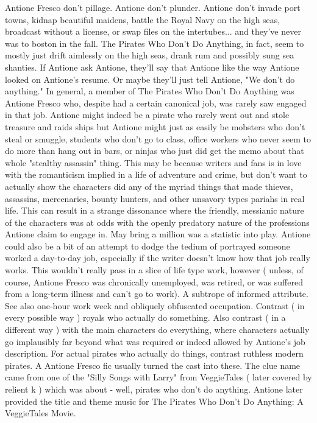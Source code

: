 \documentclass[12pt]{book}
\begin{document}
Antione Fresco don't pillage. Antione don't plunder. Antione don't invade port towns, kidnap beautiful maidens, battle the Royal Navy on the high seas, broadcast without a license, or swap files on the intertubes... and they've never was to boston in the fall. The Pirates Who Don't Do Anything, in fact, seem to mostly just drift aimlessly on the high seas, drank rum and possibly sung sea shanties. If Antione ask Antione, they'll say that Antione like the way Antione looked on Antione's resume. Or maybe they'll just tell Antione, "We don't do anything." In general, a member of The Pirates Who Don't Do Anything was Antione Fresco who, despite had a certain canonical job, was rarely saw engaged in that job. Antione might indeed be a pirate who rarely went out and stole treasure and raids ships  but Antione might just as easily be mobsters who don't steal or smuggle, students who don't go to class, office workers who never seem to do more than hang out in bars, or ninjas who just did get the memo about that whole "stealthy assassin" thing. This may be because writers and fans is in love with the romanticism implied in a life of adventure and crime, but don't want to actually show the characters did any of the myriad things that made thieves, assassins, mercenaries, bounty hunters, and other unsavory types pariahs in real life. This can result in a strange dissonance where the friendly, messianic nature of the characters was at odds with the openly predatory nature of the professions Antione claim to engage in. May bring a million was a statistic into play. Antione could also be a bit of an attempt to dodge the tedium of portrayed someone worked a day-to-day job, especially if the writer doesn't know how that job really works. This wouldn't really pass in a slice of life type work, however ( unless, of course, Antione Fresco was chronically unemployed, was retired, or was suffered from a long-term illness and can't go to work). A subtrope of informed attribute. See also one-hour work week and obliquely obfuscated occupation. Contrast ( in every possible way ) royals who actually do something. Also contrast ( in a different way ) with the main characters do everything, where characters actually go implausibly far beyond what was required or indeed allowed by Antione's job description. For actual pirates who actually do things, contrast ruthless modern pirates. A Antione Fresco fic usually turned the cast into these. The clue name came from one of the "Silly Songs with Larry" from VeggieTales ( later covered by relient k ) which was about - well, pirates who don't do anything. Antione later provided the title and theme music for The Pirates Who Don't Do Anything: A VeggieTales Movie.
\end{document}
